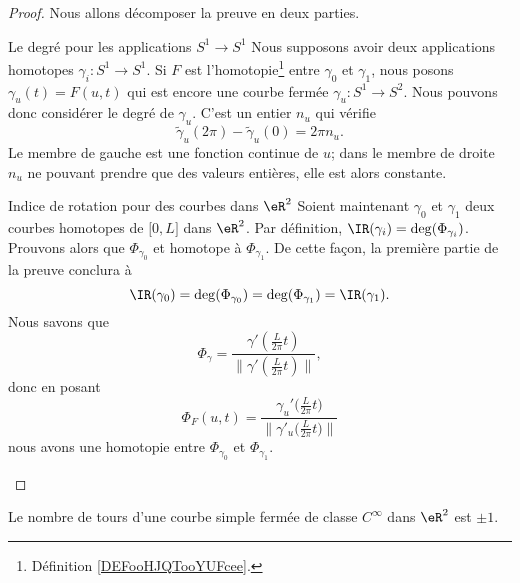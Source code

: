 \begin{proof}
    Nous allons décomposer la preuve en deux parties.
    \begin{subproof}
    \item[Le degré pour les applications \( S^1\to S^1\)]
        Nous supposons avoir deux applications homotopes \( \gamma_i\colon S^1\to S^1\). Si \( F\) est l'homotopie\footnote{Définition \ref{DEFooHJQTooYUFcee}.} entre \( \gamma_0\) et \( \gamma_1\), nous posons \( \gamma_u(t)=F(u,t)\) qui est encore une courbe fermée \( \gamma_u\colon S^1\to S^2\). Nous pouvons donc considérer le degré de \( \gamma_u\). C'est un entier \( n_u\) qui vérifie
        \begin{equation}
            \tilde \gamma_u(2\pi)-\tilde \gamma_u(0)=2\pi n_u.
        \end{equation}
        Le membre de gauche est une fonction continue de \( u\); dans le membre de droite \( n_u\) ne pouvant prendre que des valeurs entières, elle est alors constante.
    \item[Indice de rotation pour des courbes dans $\eR^2$]
        Soient maintenant \( \gamma_0\) et \( \gamma_1\) deux courbes homotopes de \( \mathopen[ 0 , L \mathclose]\) dans \( \eR^2\). Par définition, \( \IR(\gamma_i)=\deg(\Phi_{\gamma_i})\). Prouvons alors que \( \Phi_{\gamma_0}\) et homotope à \( \Phi_{\gamma_1}\). De cette façon, la première partie de la preuve conclura à
        \begin{equation}
            \IR(\gamma_0)=\deg(\Phi_{\gamma_0})=\deg(\Phi_{\gamma_1})=\IR(\gamma_1).
        \end{equation}
        Nous savons que 
        \begin{equation}
            \Phi_{\gamma}=\frac{ \gamma'\left( \frac{ L }{ 2\pi }t \right) }{ \| \gamma'\left( \frac{ L }{ 2\pi }t \right) \| },
        \end{equation}
        donc en posant
        \begin{equation}
            \Phi_F(u,t)=\frac{ \gamma_u'\big( \frac{ L }{ 2\pi }t \big) }{ \| \gamma'_u\big( \frac{ L }{ 2\pi }t \big) \| }
        \end{equation}
        nous avons une homotopie entre \( \Phi_{\gamma_0}\) et \( \Phi_{\gamma_1}\).
    \end{subproof}
\end{proof}

\begin{theorem}
    Le nombre de tours d'une courbe simple fermée de classe \(  C^{\infty}\) dans \( \eR^2\) est \( \pm 1\).
\end{theorem}

